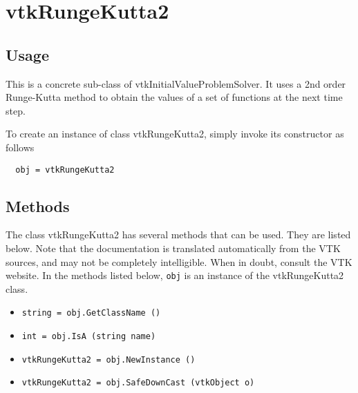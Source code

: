 \section{vtkRungeKutta2}

\subsection{Usage}

 This is a concrete sub-class of vtkInitialValueProblemSolver.
 It uses a 2nd order Runge-Kutta method to obtain the values of
 a set of functions at the next time step.

To create an instance of class vtkRungeKutta2, simply
invoke its constructor as follows
\begin{verbatim}
  obj = vtkRungeKutta2
\end{verbatim}
\subsection{Methods}

The class vtkRungeKutta2 has several methods that can be used.
  They are listed below.
Note that the documentation is translated automatically from the VTK sources,
and may not be completely intelligible.  When in doubt, consult the VTK website.
In the methods listed below, \verb|obj| is an instance of the vtkRungeKutta2 class.
\begin{itemize}
\item  \verb|string = obj.GetClassName ()|

\item  \verb|int = obj.IsA (string name)|

\item  \verb|vtkRungeKutta2 = obj.NewInstance ()|

\item  \verb|vtkRungeKutta2 = obj.SafeDownCast (vtkObject o)|

\end{itemize}
